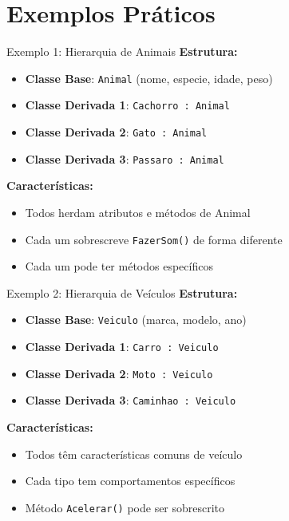 \documentclass[aspectratio=169]{beamer}
\begin{document}
\section{Exemplos Práticos}

\begin{frame}{Exemplo 1: Hierarquia de Animais}
\textbf{Estrutura:}
\begin{itemize}
\item \textbf{Classe Base}: \texttt{Animal} (nome, especie, idade, peso)
\item \textbf{Classe Derivada 1}: \texttt{Cachorro : Animal}
\item \textbf{Classe Derivada 2}: \texttt{Gato : Animal}
\item \textbf{Classe Derivada 3}: \texttt{Passaro : Animal}
\end{itemize}

\vspace{0.3cm}
\textbf{Características:}
\begin{itemize}
\item Todos herdam atributos e métodos de Animal
\item Cada um sobrescreve \texttt{FazerSom()} de forma diferente
\item Cada um pode ter métodos específicos
\end{itemize}
\end{frame}

\begin{frame}{Exemplo 2: Hierarquia de Veículos}
\textbf{Estrutura:}
\begin{itemize}
\item \textbf{Classe Base}: \texttt{Veiculo} (marca, modelo, ano)
\item \textbf{Classe Derivada 1}: \texttt{Carro : Veiculo}
\item \textbf{Classe Derivada 2}: \texttt{Moto : Veiculo}
\item \textbf{Classe Derivada 3}: \texttt{Caminhao : Veiculo}
\end{itemize}

\vspace{0.3cm}
\textbf{Características:}
\begin{itemize}
\item Todos têm características comuns de veículo
\item Cada tipo tem comportamentos específicos
\item Método \texttt{Acelerar()} pode ser sobrescrito
\end{itemize}
\end{frame}
\end{document}
